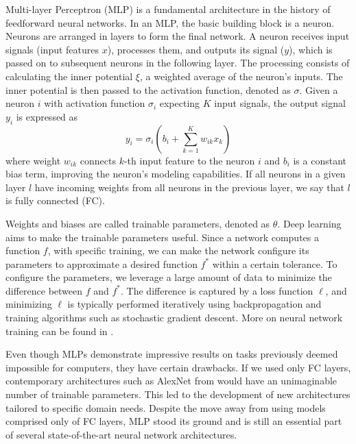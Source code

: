 Multi-layer Perceptron (MLP) is a fundamental architecture in the history of feedforward neural networks.
In an MLP, the basic building block is a neuron.
Neurons are arranged in layers to form the final network.
A neuron receives input signals (input features $x$), processes them, and outputs its signal ($y$), which is passed on to subsequent neurons in the following layer.
The processing consists of calculating the inner potential $\xi$, a weighted average of the neuron's inputs.
The inner potential is then passed to the activation function, denoted as $\sigma$. 
Given a neuron $i$ with activation function $\sigma_i$ expecting $K$ input signals, the output signal $y_i$ is expressed as
\begin{equation}
    y_i = \sigma_i(b_i + \sum_{k=1}^K w_{ik}x_k)
\end{equation}
where weight $w_{ik}$ connects $k$-th input feature to the neuron $i$ and $b_i$ is a constant bias term, improving the neuron's modeling capabilities.
If all neurons in a given layer $l$ have incoming weights from all neurons in the previous layer, we say that $l$ is fully connected (FC).

Weights and biases are called trainable parameters, denoted as $\theta$.
Deep learning aims to make the trainable parameters useful.
Since a network computes a function $f$, with specific training, we can make the network configure its parameters to approximate a desired function $f^*$ within a certain tolerance.
To configure the parameters, we leverage a large amount of data to minimize the difference between $f$ and $f^*$.
The difference is captured by a loss function $\ell$, and minimizing $\ell$ is typically performed iteratively using backpropagation and training algorithms such as stochastic gradient descent.
More on neural network training can be found in \cite{goodfellow}.

Even though MLPs demonstrate impressive results on tasks previously deemed impossible for computers, they have certain drawbacks.
If we used only FC layers, contemporary architectures such as AlexNet from \cite{alexnet} would have an unimaginable number of trainable parameters.
This led to the development of new architectures tailored to specific domain needs.
Despite the move away from using models comprised only of FC layers, MLP stood its ground and is still an essential part of several state-of-the-art neural network architectures.

